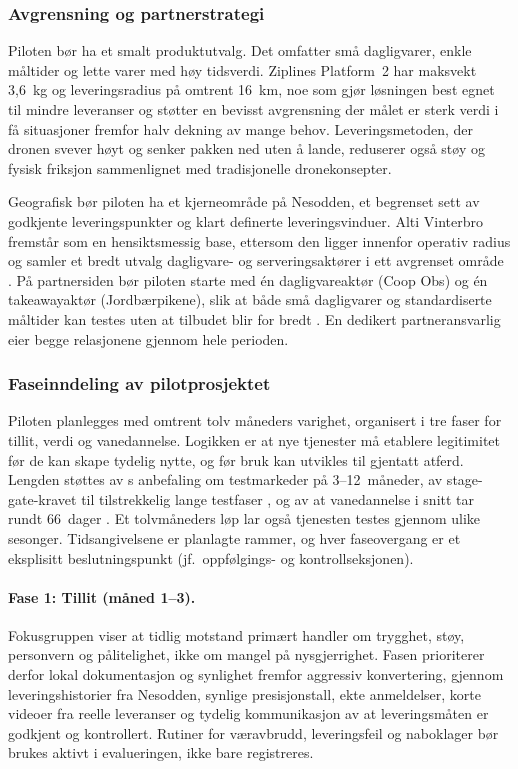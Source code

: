 \subsubsection{Avgrensning og partnerstrategi}

Piloten bør ha et smalt produktutvalg. Det omfatter små dagligvarer, enkle
måltider og lette varer med høy tidsverdi. Ziplines Platform~2 har maksvekt
3{,}6~kg og leveringsradius på omtrent 16~km, noe som gjør løsningen best
egnet til mindre leveranser og støtter en bevisst avgrensning der målet er
sterk verdi i få situasjoner fremfor halv dekning av mange behov. Leveringsmetoden, der
dronen svever høyt og senker pakken ned uten å lande, reduserer også støy og
fysisk friksjon sammenlignet med tradisjonelle dronekonsepter.

Geografisk bør piloten ha et kjerneområde på Nesodden, et begrenset sett av
godkjente leveringspunkter og klart definerte leveringsvinduer. Alti
Vinterbro fremstår som en hensiktsmessig base, ettersom den ligger
innenfor operativ radius og samler et bredt utvalg dagligvare- og
serveringsaktører i ett avgrenset område \parencite{altivinterbro}. På partnersiden bør piloten
starte med én dagligvareaktør (Coop Obs) og én takeawayaktør
(Jordbærpikene), slik at både små dagligvarer og standardiserte måltider
kan testes uten at tilbudet blir for bredt
\parencite{altivinterbro, jordbarpikene}. En dedikert partneransvarlig eier
begge relasjonene gjennom hele perioden.

\subsubsection{Faseinndeling av pilotprosjektet}

Piloten planlegges med omtrent tolv måneders varighet, organisert i tre
faser for tillit, verdi og vanedannelse. Logikken er at nye tjenester må
etablere legitimitet før de kan skape tydelig nytte, og før bruk kan
utvikles til gjentatt atferd. Lengden støttes av
\textcite{kotlerkeller2016}s anbefaling om testmarkeder på 3--12~måneder,
av stage-gate-kravet til tilstrekkelig lange testfaser
\parencite{cooper1990}, og av at vanedannelse i snitt tar rundt 66~dager
\parencite{lally2010}. Et tolvmåneders løp lar også tjenesten testes
gjennom ulike sesonger. Tidsangivelsene er planlagte rammer, og hver
faseovergang er et eksplisitt beslutningspunkt (jf.\ oppfølgings- og
kontrollseksjonen).

\paragraph{Fase 1: Tillit (måned 1--3).}
Fokusgruppen viser at tidlig motstand primært handler om trygghet, støy,
personvern og pålitelighet, ikke om mangel på nysgjerrighet. Fasen
prioriterer derfor lokal dokumentasjon og synlighet fremfor aggressiv
konvertering, gjennom leveringshistorier fra Nesodden, synlige
presisjonstall, ekte anmeldelser, korte videoer fra reelle leveranser og
tydelig kommunikasjon av at leveringsmåten er godkjent og kontrollert. Rutiner for væravbrudd,
leveringsfeil og naboklager bør brukes aktivt i evalueringen, ikke bare
registreres.


